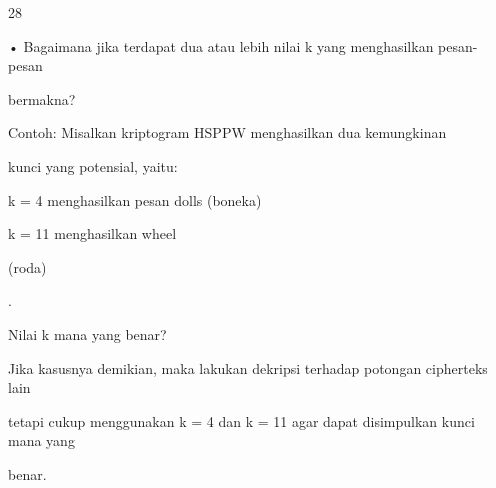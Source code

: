 \documentclass{article}
\begin{document}

28

• Bagaimana jika terdapat dua atau lebih nilai k yang menghasilkan pesan-pesan 

bermakna?

  Contoh: Misalkan kriptogram  HSPPW menghasilkan dua kemungkinan  

               kunci yang potensial, yaitu:



 k = 4 menghasilkan pesan dolls     (boneka)



k = 11 menghasilkan wheel  

   (roda)  

. 


  Nilai k mana yang benar?

 Jika kasusnya demikian, maka lakukan dekripsi terhadap potongan cipherteks lain 

tetapi cukup menggunakan k = 4 dan k = 11  agar dapat disimpulkan kunci mana yang 

benar.
\end{document}
